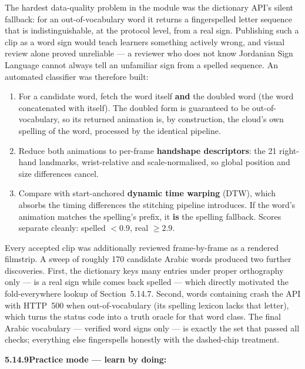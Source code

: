\noindent The hardest data-quality problem in the module was the dictionary API's silent fallback: for an out-of-vocabulary word it returns a fingerspelled letter sequence that is indistinguishable, at the protocol level, from a real sign. Publishing such a clip as a word sign would teach learners something actively wrong, and visual review alone proved unreliable --- a reviewer who does not know Jordanian Sign Language cannot always tell an unfamiliar sign from a spelled sequence. An automated classifier was therefore built:
\begin{enumerate}
\item For a candidate word, fetch the word itself \textbf{and} the doubled word (the word concatenated with itself). The doubled form is guaranteed to be out-of-vocabulary, so its returned animation is, by construction, the cloud's own spelling of the word, processed by the identical pipeline.
\item Reduce both animations to per-frame \textbf{handshape descriptors}: the 21 right-hand landmarks, wrist-relative and scale-normalised, so global position and size differences cancel.
\item Compare with start-anchored \textbf{dynamic time warping} (DTW), which absorbs the timing differences the stitching pipeline introduces. If the word's animation matches the spelling's prefix, it \textbf{is} the spelling fallback. Scores separate cleanly: spelled $<0.9$, real $\geq 2.9$.
\end{enumerate}
\vspace{0.1cm}

\noindent Every accepted clip was additionally reviewed frame-by-frame as a rendered filmstrip. A sweep of roughly 170 candidate Arabic words produced two further discoveries. First, the dictionary keys many entries under proper orthography only ---  is a real sign while  comes back spelled --- which directly motivated the fold-everywhere lookup of Section~5.14.7. Second, words containing  crash the API with HTTP~500 when out-of-vocabulary (its spelling lexicon lacks that letter), which turns the status code into a truth oracle for that word class. The final Arabic vocabulary --- verified word signs only --- is exactly the set that passed all checks; everything else fingerspells honestly with the dashed-chip treatment.\par\vspace{0.3cm}

\noindent\textbf{5.14.9\quad Practice mode --- learn by doing:}\par
{}
\vspace{0.2cm}

